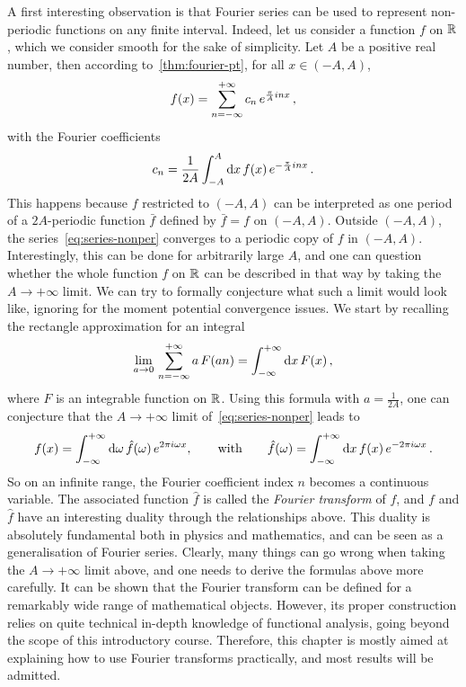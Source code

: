 A first interesting observation is that Fourier series can be used to represent
non-periodic functions on any finite interval. Indeed, let us consider a function $f$ on
$\mathbb{R}$, which we consider smooth for the sake of simplicity. Let $A$ be a positive real
number, then according to~\cref{thm:fourier-pt}, for all $x\in(-A,A)$,
\begin{equation}
  f(x)=\sum_{n=-\infty}^{+\infty}c_n\,e^{\frac{\pi}{A}inx}\,,\label{eq:series-nonper}
\end{equation}
with the Fourier coefficients
\begin{equation}
  c_n=\frac{1}{2A}\int_{-A}^{A}\mathrm{d} x\,f(x)\,e^{-\frac{\pi}{A}inx}\,.\label{eq:cn-nonper}
\end{equation}
This happens because $f$ restricted to $(-A,A)$ can be interpreted as one period of a
$2A$-periodic function $\bar{f}$ defined by $\bar{f}=f$ on $(-A,A)$. Outside $(-A,A)$, the
series~\cref{eq:series-nonper} converges to a periodic copy of $f$ in $(-A,A)$.
Interestingly, this can be done for arbitrarily large $A$, and one can question whether
the whole function $f$ on $\mathbb{R}$ can be described in that way by taking the $A\to+\infty$
limit. We can try to formally conjecture what such a limit would look like, ignoring for
the moment potential convergence issues. We start by recalling the rectangle approximation
for an integral
\begin{equation}
  \lim_{a\to0}\,\sum_{n=-\infty}^{+\infty}a\,F(an)=\int_{-\infty}^{+\infty}\mathrm{d} x\, F(x)\,,
\end{equation}
where $F$ is an integrable function on $\mathbb{R}$. Using this formula with $a=\frac{1}{2A}$, one
can conjecture that the $A\to+\infty$ limit of~\cref{eq:series-nonper} leads to
\begin{equation}
  \label{eq:ft-conjecture}
  f(x)=\int_{-\infty}^{+\infty}\mathrm{d}\omega\,\hat{f}(\omega)\,e^{2\pi i\omega x},
  \qquad\text{with}\qquad
  \hat{f}(\omega)=\int_{-\infty}^{+\infty}\mathrm{d} x\,f(x)\,e^{-2\pi i\omega x}\,.
\end{equation}
So on an infinite range, the Fourier coefficient index $n$ becomes a continuous variable.
The associated function $\hat{f}$ is called the \emph{Fourier transform} of $f$, and $f$
and $\hat{f}$ have an interesting duality through the relationships above. This duality is
absolutely fundamental both in physics and mathematics, and can be seen as a
generalisation of Fourier series. Clearly, many things can go wrong when taking the
$A\to+\infty$ limit above, and one needs to derive the formulas above more carefully. It
can be shown that the Fourier transform can be defined for a remarkably wide range of
mathematical objects. However, its proper construction relies on quite technical in-depth
knowledge of functional analysis, going beyond the scope of this introductory course.
Therefore, this chapter is mostly aimed at explaining how to use Fourier transforms
practically, and most results will be admitted.


